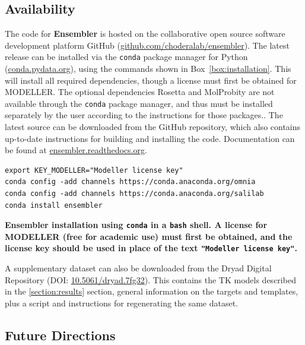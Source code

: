 \documentclass[10pt,letterpaper]{article}
\begin{document}
\subsection*{Availability}

The code for {\bf Ensembler} is hosted on the collaborative open source software development platform GitHub (\href{http://github.com/choderalab/ensembler}{github.com/choderalab/ensembler}).
The latest release can be installed via the {\tt conda} package manager for Python (\href{http://conda.pydata.org}{conda.pydata.org}), using the commands shown in Box~\ref{box:installation}.
This will install all required dependencies, though a license must first be obtained for MODELLER.
The optional dependencies Rosetta and MolProbity are not available through the {\tt conda} package manager, and thus must be installed separately by the user according to the instructions for those packages..
The latest source can be downloaded from the GitHub repository, which also contains up-to-date instructions for building and installing the code.
Documentation can be found at \href{http://ensembler.readthedocs.org/en/latest/}{ensembler.readthedocs.org}.

\begin{codebox}[h]
\begin{adjustwidth}{-2.25in}{0in}
\footnotesize
\begin{Verbatim}[frame=single]
export KEY_MODELLER="Modeller license key"
conda config -add channels https://conda.anaconda.org/omnia
conda config -add channels https://conda.anaconda.org/salilab
conda install ensembler
\end{Verbatim}
\caption{{\bf Ensembler installation using {\tt conda} in a {\tt bash} shell. A license for MODELLER (free for academic use) must first be obtained, and the license key should be used in place of the text {\tt "Modeller license key"}.}
}
\label{box:installation}
\end{adjustwidth}
\end{codebox}

A supplementary dataset can also be downloaded from the Dryad Digital Repository (DOI: \href{https://dx.doi.org/10.5061/dryad.7fg32}{10.5061/dryad.7fg32}).
This contains the TK models described in the \ref{section:results} section, general information on the targets and templates, plus a script and instructions for regenerating the same dataset.

\subsection*{Future Directions}
\end{document}
